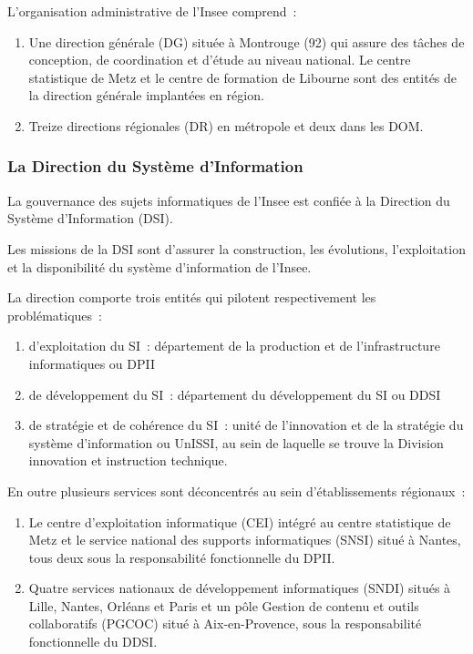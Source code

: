 L'organisation administrative de l'Insee comprend~:
\begin{enumerate}
    \item Une direction générale (DG) située à Montrouge (92) qui assure des tâches de conception, de coordination et d'étude au niveau national. Le centre statistique de Metz et le centre de formation de Libourne sont des entités de la direction générale implantées en région.
    \item Treize directions régionales (DR) en métropole et deux dans les DOM.
\end{enumerate}

\subsubsection*{La Direction du Système d'Information}

La gouvernance des sujets informatiques de l’Insee est confiée à la Direction du Système d'Information (DSI). 
\newline

Les missions de la DSI sont d’assurer la construction, les évolutions, l'exploitation et la disponibilité du système d'information de l'Insee.
\newline

La direction comporte trois entités qui pilotent respectivement les problématiques~:
\begin{enumerate}
    \item d'exploitation du SI~: département de la production et de l'infrastructure informatiques ou DPII
    \item de développement du SI~: département du développement du SI ou DDSI
    \item de stratégie et de cohérence du SI~: unité de l'innovation et de la stratégie du système d'information ou UnISSI, au sein de laquelle se trouve la Division innovation et instruction technique.
    \newline
\end{enumerate}

En outre plusieurs services sont déconcentrés au sein d’établissements régionaux~:
\begin{enumerate}
    \item  Le centre d’exploitation informatique (CEI) intégré au centre statistique de Metz et le service national des supports informatiques (SNSI) situé à Nantes, tous deux sous la responsabilité fonctionnelle du DPII.
    \item Quatre services nationaux de développement informatiques (SNDI) situés à Lille, Nantes, Orléans et Paris et un pôle Gestion de contenu et outils collaboratifs (PGCOC) situé à Aix-en-Provence, sous la responsabilité fonctionnelle du DDSI.
\end{enumerate}

